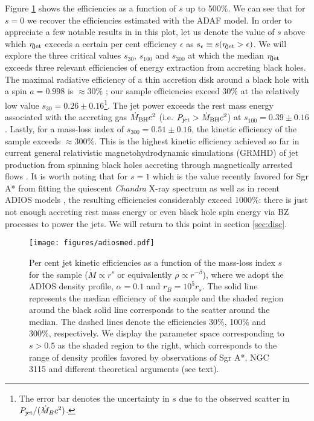 \documentclass[useAMS,usenatbib]{mn2e}
\begin{document}
Figure \ref{fig:median} shows the efficiencies as a function of $s$ up to 500\%. We can see that for $s=0$ we recover the efficiencies estimated with the ADAF model.  In order to appreciate a few notable results in in this plot, let us denote the value of $s$ above which $\eta_{\rm jet}$ exceeds a certain per cent efficiency $\epsilon$ as $s_\epsilon \equiv s(\eta_{\rm jet} > \epsilon)$. We will explore the three critical values $s_{30}$, $s_{100}$ and $s_{300}$ at which the median $\eta_{\rm jet}$ exceeds three relevant efficiencies of energy extraction from accreting black holes.
The maximal radiative efficiency of a thin accretion disk around a black hole with a spin $a=0.998$ is $\approx 30\%$ \citep{Thorne74}; our sample efficiencies exceed 30\% at the relatively low value $s_{30}=0.26 \pm 0.16$\footnote{The error bar denotes the uncertainty in $s$ due to the observed scatter in $P_{\rm jet}/(\dot{M}_B c^2)$.}.
The jet power exceeds the rest mass energy associated with the accreting gas $\dot{M}_{\rm BH} c^2$ (i.e. $P_{\rm jet} > \dot{M}_{\rm BH} c^2$) at $s_{100}=0.39 \pm 0.16$. 
Lastly, for a mass-loss index of $s_{300}=0.51 \pm 0.16$, the kinetic efficiency of the sample exceeds $\approx 300\%$. This is the highest kinetic efficiency achieved so far in current general relativistic magnetohydrodynamic simulations (GRMHD) of jet production from spinning black holes accreting through magnetically arrested flows \citep{Sasha11,McKinney12}. 
It is worth noting that for $s=1$ which is the value recently favored for Sgr A* from fitting the quiescent \emph{Chandra} X-ray spectrum \citep{Wang13} as well as in recent ADIOS models \citep{Begelman12}, the resulting efficiencies considerably exceed 1000\%: there is just not enough accreting rest mass energy or even black hole spin energy via BZ processes to power the jets. We will return to this point in section \ref{sec:disc}.

\begin{figure}
\centering
\texttt{[image: figures/adiosmed.pdf]}
\caption{Per cent jet kinetic efficiencies as a function of the mass-loss index $s$ for the sample ($\dot{M} \propto r^s$ or equivalently $\rho \propto r^{-\beta}$), where we adopt the ADIOS density profile, $\alpha=0.1$ and $r_B=10^5 r_s$. The solid line represents the median efficiency of the sample and the shaded region around the black solid line corresponds to the scatter around the median. The dashed lines denote the efficiencies 30\%, 100\% and 300\%, respectively. We display the parameter space corresponding to $s>0.5$ as the shaded region to the right, which corresponds to the range of density profiles favored by observations of Sgr A*, NGC 3115 and different theoretical arguments (see text).}
\label{fig:median}
\end{figure}
\end{document}
